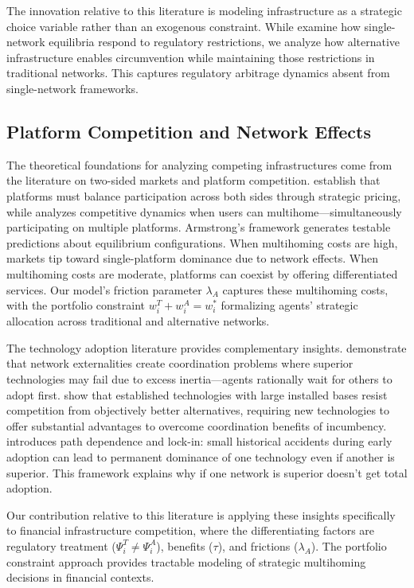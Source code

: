 \documentclass[12pt]{article}
\begin{document}
The innovation relative to this literature is modeling infrastructure as a strategic choice variable rather than an exogenous constraint. While \citet{jalan_incentive-aware_2024} examine how single-network equilibria respond to regulatory restrictions, we analyze how alternative infrastructure enables circumvention while maintaining those restrictions in traditional networks. This captures regulatory arbitrage dynamics absent from single-network frameworks.

\subsection{Platform Competition and Network Effects}

The theoretical foundations for analyzing competing infrastructures come from the literature on two-sided markets and platform competition. \citet{rochet_platform_2003} establish that platforms must balance participation across both sides through strategic pricing, while \citet{armstrong_competition_2006} analyzes competitive dynamics when users can multihome—simultaneously participating on multiple platforms. Armstrong's framework generates testable predictions about equilibrium configurations. When multihoming costs are high, markets tip toward single-platform dominance due to network effects. When multihoming costs are moderate, platforms can coexist by offering differentiated services. Our model's friction parameter $\lambda_A$ captures these multihoming costs, with the portfolio constraint $w_i^T + w_i^A = w_i^*$ formalizing agents' strategic allocation across traditional and alternative networks.

The technology adoption literature provides complementary insights. \citet{katz_network_1985} demonstrate that network externalities create coordination problems where superior technologies may fail due to excess inertia—agents rationally wait for others to adopt first. \citet{farrell_installed_1986} show that established technologies with large installed bases resist competition from objectively better alternatives, requiring new technologies to offer substantial advantages to overcome coordination benefits of incumbency. \citet{arthur_competing_1989} introduces path dependence and lock-in: small historical accidents during early adoption can lead to permanent dominance of one technology even if another is superior. This framework explains why if one network is superior doesn't get total adoption.

Our contribution relative to this literature is applying these insights specifically to financial infrastructure competition, where the differentiating factors are regulatory treatment ($\Psi_i^T \neq \Psi_i^A$), benefits ($\tau$), and frictions ($\lambda_A$). The portfolio constraint approach provides tractable modeling of strategic multihoming decisions in financial contexts.
\end{document}
